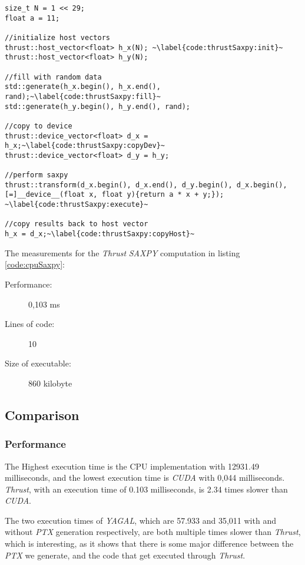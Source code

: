 \begin{lstlisting}[caption={\textit{Thrust} \textit{SAXPY} example.}, label={code:thrustSaxpy}]
size_t N = 1 << 29;
float a = 11;

//initialize host vectors
thrust::host_vector<float> h_x(N); ~\label{code:thrustSaxpy:init}~
thrust::host_vector<float> h_y(N);

//fill with random data
std::generate(h_x.begin(), h_x.end(), rand);~\label{code:thrustSaxpy:fill}~
std::generate(h_y.begin(), h_y.end(), rand);

//copy to device
thrust::device_vector<float> d_x = h_x;~\label{code:thrustSaxpy:copyDev}~
thrust::device_vector<float> d_y = h_y;

//perform saxpy
thrust::transform(d_x.begin(), d_x.end(), d_y.begin(), d_x.begin(), [=]__device__(float x, float y){return a * x + y;}); ~\label{code:thrustSaxpy:execute}~

//copy results back to host vector
h_x = d_x;~\label{code:thrustSaxpy:copyHost}~
\end{lstlisting}

The measurements for the \textit{Thrust} \textit{SAXPY} computation in listing \ref{code:cpuSaxpy}:
\begin{description}
    \item[Performance:] 0,103 ms
    \item[Lines of code:] 10 
    \item[Size of executable:] 860 kilobyte
\end{description}

\subsection{Comparison}

\subsubsection[*]{Performance}
The Highest execution time is the CPU implementation with 12931.49 milliseconds, and the lowest execution time is \textit{CUDA} with 0,044 milliseconds. \textit{Thrust}, with an execution time of 0.103 milliseconds, is 2.34 times slower than \textit{CUDA}.

The two execution times of \textit{YAGAL}, which are 57.933 and 35,011 with and without \textit{PTX} generation respectively, are both multiple times slower than \textit{Thrust}, which is interesting, as it shows that there is some major difference between the \textit{PTX} we generate, and the code that get executed through \textit{Thrust}.

